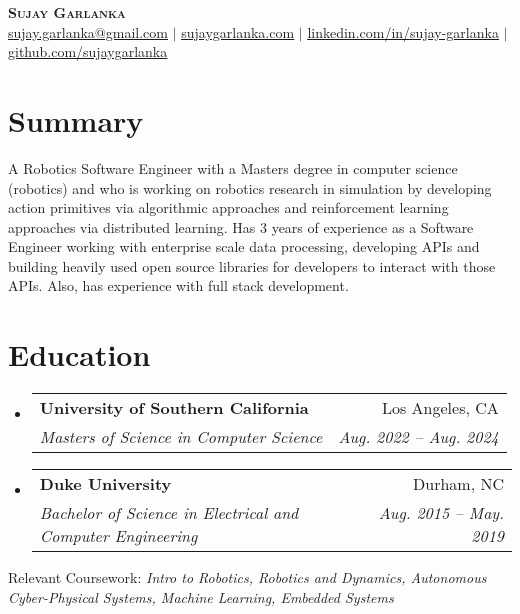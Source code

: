 \documentclass[letterpaper,10pt]{article}
\makeatletter
\newcommand{\resumeSubheading}[4]{
  \vspace{-2pt}\item
    \begin{tabular*}{0.97\textwidth}[t]{l@{\extracolsep{\fill}}r}
      \textbf{#1} & #2 \\
      \textit{\small#3} & \textit{\small #4} \\
    \end{tabular*}\vspace{-7pt}
}
\newcommand{\resumeSubHeadingListStart}{\begin{itemize}[leftmargin=0.15in, label={}]}
\newcommand{\resumeSubHeadingListEnd}{\end{itemize}}
\makeatother
\begin{document}

\begin{center}
    \textbf{\Huge \scshape Sujay Garlanka} \\ \vspace{1pt}
    \href{mailto:sujay.garlanka@gmail.com}
    {\small \underline{sujay.garlanka@gmail.com}} $|$ 
    \href{https://www.sujaygarlanka.com}
    {\small \underline{sujaygarlanka.com}} $|$
    \href{https://www.linkedin.com/in/sujay-garlanka/}
    {\small \underline{linkedin.com/in/sujay-garlanka}} $|$
    \href{https://github.com/sujaygarlanka}
    {\small \underline{github.com/sujaygarlanka}}
\end{center}

\section{Summary}
    \small A Robotics Software Engineer with a Masters degree in computer science (robotics) and who is working on robotics research in simulation by developing action primitives via algorithmic approaches and reinforcement learning approaches via distributed learning. Has 3 years of experience as a Software Engineer working with enterprise scale data processing, developing APIs and building heavily used open source libraries for developers to interact with those APIs. Also, has experience with full stack development. 

\section{Education}
  \resumeSubHeadingListStart
    \resumeSubheading
      {University of Southern California}{Los Angeles, CA}
      {Masters of Science in Computer Science}{Aug. 2022 -- Aug. 2024}
    \resumeSubheading
      {Duke University}{Durham, NC}
      {Bachelor of Science in Electrical and Computer Engineering}{Aug. 2015 -- May. 2019}
  \resumeSubHeadingListEnd
  \vspace{3pt}
  Relevant Coursework: \emph{Intro to Robotics, Robotics and Dynamics, Autonomous Cyber-Physical Systems, Machine Learning, Embedded Systems}
\end{document}
